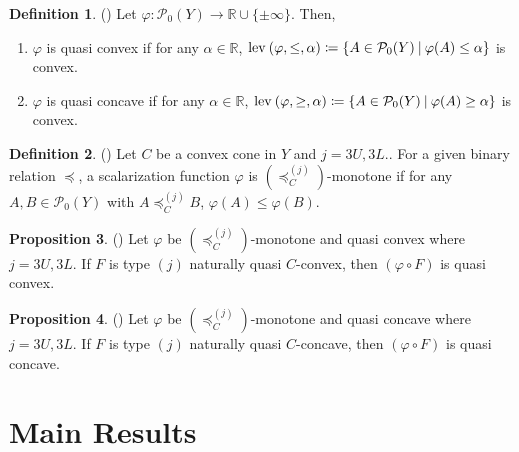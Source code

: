 \documentclass[a4paper,11pt]{jsarticle}
\theoremstyle{definition}
\newtheorem{dfn}{Definition}[section]
\newtheorem{prop}[dfn]{Proposition}
\newcommand{\RealNumberSet}{\mathbb{R}}
\newcommand{\OrderingLevelSets}[3]{\text{\rm lev\:$({#1}, {#2}, {#3})$}} %
\newcommand{\pow}[1]{\mathcal{P}_{0}(#1)}
\newcommand{\SetForm}[2]{
  \{{#1}\:|\:{#2}\}
}
\newcommand{\setrel}[2]{\preccurlyeq^{(#1)}_{#2}\!}
\begin{document}
\begin{dfn}{(\cite{KobayashiSaitoTanaka2016})}
  Let $\varphi \colon \pow{Y} \to \RealNumberSet \cup \{\pm \infty\}$. Then,
  \begin{enumerate}
    \item $\varphi$ is quasi convex if for any $\alpha \in \RealNumberSet$,
          $\OrderingLevelSets{\varphi}{\leq}{\alpha} \coloneqq \SetForm{A \in \pow{Y}}{\varphi(A) \leq \alpha}$ is convex.
    \item $\varphi$ is quasi concave if for any $\alpha \in \RealNumberSet$,
          $\OrderingLevelSets{\varphi}{\geq}{\alpha} \coloneqq \SetForm{A \in \pow{Y}}{\varphi(A) \geq \alpha}$ is convex.
  \end{enumerate}
\end{dfn}

\begin{dfn}{(\cite{KobayashiSaitoTanaka2016})}
  Let $C$ be a convex cone in $Y$ and $j= 3U, 3L$..
  For a given binary relation $\preccurlyeq$,
  a scalarization function $\varphi$ is $(\setrel{j}{C})$-monotone if
  for any $A, B \in \pow{Y}$ with
  $A \setrel{j}{C} B$, $\varphi (A) \leq \varphi (B)$.
\end{dfn}

\begin{prop}{(\cite{KobayashiSaitoTanaka2016})}
  Let $\varphi$ be $(\setrel{j}{C})$-monotone and quasi convex where $j= 3U, 3L$.
  If $F$ is type $(j)$ naturally quasi $C$-convex,
  then $(\varphi \circ F)$ is quasi convex.
\end{prop}

\begin{prop}{(\cite{KobayashiSaitoTanaka2016})}
  Let $\varphi$ be $(\setrel{j}{C})$-monotone and quasi concave where $j= 3U, 3L$.
  If $F$ is type $(j)$ naturally quasi $C$-concave,
  then $(\varphi \circ F)$ is quasi concave.
\end{prop}

\section{\rm Main Results}
\end{document}
